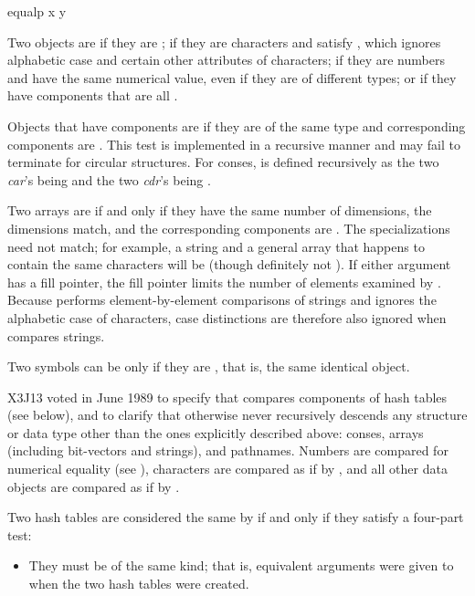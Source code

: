 \begin{defun}[Function]
equalp x y

Two objects are  if they are ;
if they are characters and satisfy ,
which ignores alphabetic case and certain other attributes of characters;
if they are numbers and have the same numerical value,
even if they are of different types;
or if they have components that are all .

Objects that have components are  if they are of the same
type and corresponding components are .
This test is implemented in a recursive manner and may fail to
terminate for circular structures.
For conses,  is defined recursively as
the two {\it car}'s being  and the two {\it cdr}'s being .

Two arrays are  if and only if they have the same
number of dimensions, the dimensions match,
and the corresponding components are .
The specializations need not match; for example,
a string and a general array that happens to contain the same characters
will be  (though definitely not ).
If either argument has a fill pointer, the fill pointer limits
the number of elements examined by .
Because  performs element-by-element comparisons
of strings and ignores the alphabetic case of characters,
case distinctions are therefore also ignored when  compares
strings.

Two symbols can be  only if they are , that is, the same
identical object.

\begin{new}
X3J13 voted in June 1989
to specify that  compares components
of hash tables (see below), and to
clarify that otherwise  never recursively
descends any structure or data type other than the ones explicitly
described above: conses, arrays (including bit-vectors and strings), and pathnames.
Numbers are compared for numerical equality (see \cd{=}),
characters are compared as if by , and all other
data objects are compared as if by .

Two hash tables are considered the same by  if and only if
they satisfy a four-part test:
\begin{itemize}
\item They must be
of the same kind; that is, equivalent  arguments were given to
 when the two hash tables were created.


\end{itemize}
\end{new}
\end{defun}
